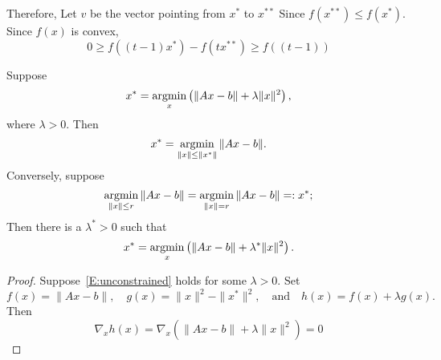 \documentclass[12pt]{amsart}
\begin{document}
Therefore, 
Let $v$ be the vector pointing from $x^*$ to $x^{**}$
Since $f(x^{**})\leq f(x^*)$. Since $f(x)$ is convex,
\[
    0 \geq f((t-1)x^*) - f(tx^{**}) \geq f((t-1))
\]


\begin{theorem}
    Suppose
    \begin{equation}\label{E:unconstrained}
        x^* = \operatorname*{argmin}_x\left( \|Ax-b\| + \lambda \|x\|^2\right),
    \end{equation}
    where $\lambda>0$.
    Then
    \[
        x^*=\operatorname*{argmin}_{\|x\|\leq \|x^*\|}\|Ax-b\|.
    \]
    Conversely, suppose
    \[
        \operatorname*{argmin}_{\|x\|\leq r}\|Ax-b\| 
        = \operatorname*{argmin}_{\|x\|=r}\|Ax-b\|=: x^*;
    \]
    Then there is a $\lambda^*>0$ such that
    \[
        x^* = \operatorname*{argmin}_x\left(\|Ax-b\| + \lambda^* \|x\|^2\right).
    \]
\end{theorem}

\begin{proof}
    Suppose~\eqref{E:unconstrained} holds for some $\lambda >0$.
    Set
    \[
        f(x) = \|Ax-b\|,\quad
        g(x)=\|x\|^2 - \|x^*\|^2,
        \quad\text{and}\quad
        h(x) = f(x) + \lambda g(x).
    \]
    Then
    \[
    \nabla_x h(x) = \nabla_x \left( \|Ax-b\| + \lambda \|x\|^2\right) = 0
    \]

\end{proof}
\end{document}
